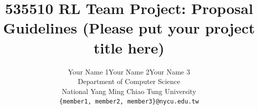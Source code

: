 \documentclass{article}
\title{535510 RL Team Project: Proposal Guidelines (Please put your project title here)}
\author{%
  Your Name 1\quad Your Name 2\quad Your Name 3\\
  Department of Computer Science\\
  National Yang Ming Chiao Tung University\\
  \texttt{\{member1, member2, member3\}@nycu.edu.tw}
}
\begin{document}
\maketitle














\newpage
{
\small


}
\end{document}
